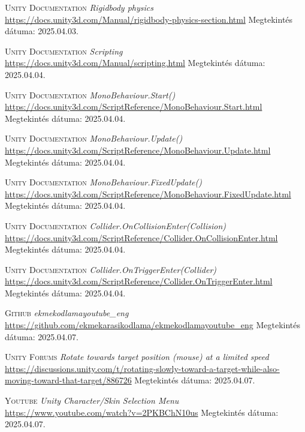 \documentclass[
]{thesis-ekf}
\theoremstyle{definition}
\theoremstyle{remark}
\begin{document}
\begin{thebibliography}{55}
    \textsc{Unity Documentation} \emph{Rigidbody physics} \\
    \url{https://docs.unity3d.com/Manual/rigidbody-physics-section.html} Megtekintés dátuma: 2025.04.03.

    \textsc{Unity Documentation} \emph{Scripting} \\
    \url{https://docs.unity3d.com/Manual/scripting.html} Megtekintés dátuma: 2025.04.04.

    \textsc{Unity Documentation} \emph{MonoBehaviour.Start()} \\
    \url{https://docs.unity3d.com/ScriptReference/MonoBehaviour.Start.html} Megtekintés dátuma: 2025.04.04.

    \textsc{Unity Documentation} \emph{MonoBehaviour.Update()} \\
    \url{https://docs.unity3d.com/ScriptReference/MonoBehaviour.Update.html} Megtekintés dátuma: 2025.04.04.

    \textsc{Unity Documentation} \emph{MonoBehaviour.FixedUpdate()} \\
    \url{https://docs.unity3d.com/ScriptReference/MonoBehaviour.FixedUpdate.html} Megtekintés dátuma: 2025.04.04.

    \textsc{Unity Documentation} \emph{Collider.OnCollisionEnter(Collision)} \\
    \url{https://docs.unity3d.com/ScriptReference/Collider.OnCollisionEnter.html} Megtekintés dátuma: 2025.04.04.

    \textsc{Unity Documentation} \emph{Collider.OnTriggerEnter(Collider)} \\
    \url{https://docs.unity3d.com/ScriptReference/Collider.OnTriggerEnter.html} Megtekintés dátuma: 2025.04.04.

    \textsc{Github} \emph{ekmekodlamayoutube\_eng} \\
    \url{https://github.com/ekmekarasikodlama/ekmekodlamayoutube_eng} Megtekintés dátuma: 2025.04.07.

    \textsc{Unity Forums} \emph{Rotate towards target position (mouse) at a limited speed} \\
    \url{https://discussions.unity.com/t/rotating-slowly-toward-a-target-while-also-moving-toward-that-target/886726} Megtekintés dátuma: 2025.04.07.

    \textsc{Youtube} \emph{Unity Character/Skin Selection Menu} \\
    \url{https://www.youtube.com/watch?v=2PKBChN10us} Megtekintés dátuma: 2025.04.07.


\end{thebibliography}
\end{document}
